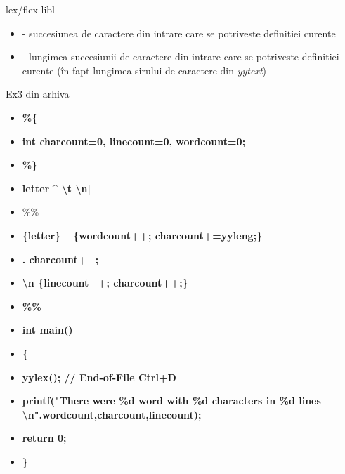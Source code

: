 \documentclass[pdf]{beamer}
\begin{document}
\begin{frame}{lex/flex libl}
\begin{itemize}
\item
\color{red}{char*yytext} \color{black}- succesiunea de caractere din intrare care se potriveste definitiei curente
\newline
\item
\color{red}{int yyleng} \color{black} - lungimea succesiunii de caractere din intrare care se potriveste definitiei curente (în fapt lungimea sirului de caractere din \textit{yytext})
\newline

\end{itemize}
\end{frame}



\begin{frame}{Ex3 din arhiva}
\begin{itemize}
\item[]
\textbf{\%\{}
\item[]
\textbf{int charcount=0, linecount=0, wordcount=0;}
\item[]
\textbf{\%\}}
\item[]
\textbf{letter[\^{} \textbackslash t \textbackslash n]}
\item[]
\%\%
\item[]
\textbf{\{letter\}+ \{wordcount++; charcount+=yyleng;\}}
\item[]
\textbf{. charcount++;}
\item[]
\textbf{\textbackslash n \{linecount++; charcount++;\}}
\item[]
\textbf{\%\%}
\item[]
\textbf{int main()}
\item[]
\textbf{\{}
\item[]
\textbf{yylex(); // End-of-File Ctrl+D }
\item[]
\textbf{printf("There were \%d word with \%d characters in \%d lines \textbackslash n".wordcount,charcount,linecount);}
\item[]
\textbf{return 0;}
\item[]
\textbf{\}}
\end{itemize}
\end{frame}
\end{document}
